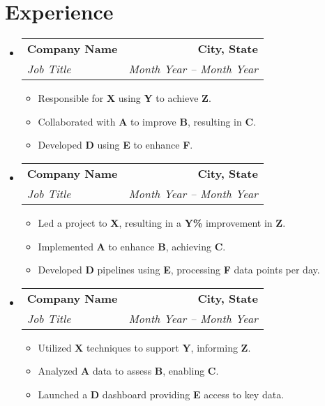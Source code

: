 \documentclass[11pt]{article}
\makeatletter
\newcommand{\resumeSubheadingEducation}[4]{
  \vspace{8pt}\item
    \begin{tabular*}{0.97\textwidth}[t]{@{}l@{\extracolsep{\fill}}r@{}}
      \textbf{#1} & \textbf{#2} \\
      \textit{#3} & \textit{#4} \\
    \end{tabular*}\vspace{-5pt}
}
\newcommand{\singleSubItem}[1]{\item #1\vspace{-4pt}}
\newcommand{\resumeSubHeadingListStart}{\begin{itemize}[leftmargin=*]}
\newcommand{\resumeSubHeadingListEnd}{\end{itemize}}
\newcommand{\resumeItemListStart}{\begin{itemize}}
\newcommand{\resumeItemListEnd}{\end{itemize}\vspace{-5pt}}
\makeatother
\begin{document}
\section{Experience}
  \resumeSubHeadingListStart
  \vspace{-10pt}
\resumeSubheadingEducation{Company Name}{City, State}{Job Title}{Month Year -- Month Year}
      \resumeItemListStart
        \vspace{-1pt}        
        \singleSubItem{Responsible for \textbf{X} using \textbf{Y} to achieve \textbf{Z}.}    
        \singleSubItem{Collaborated with \textbf{A} to improve \textbf{B}, resulting in \textbf{C}.}
        \singleSubItem{Developed \textbf{D} using \textbf{E} to enhance \textbf{F}.}
      \resumeItemListEnd
\vspace{-10pt} 
\resumeSubheadingEducation{Company Name}{City, State}{Job Title}{Month Year -- Month Year}
      \resumeItemListStart
        \vspace{-1pt}
        \singleSubItem{Led a project to \textbf{X}, resulting in a \textbf{Y\%} improvement in \textbf{Z}.}
        \singleSubItem{Implemented \textbf{A} to enhance \textbf{B}, achieving \textbf{C}.}
        \singleSubItem{Developed \textbf{D} pipelines using \textbf{E}, processing \textbf{F} data points per day.}
      \resumeItemListEnd
\vspace{-10pt}
\resumeSubheadingEducation{Company Name}{City, State}{Job Title}{Month Year -- Month Year}
      \resumeItemListStart
        \vspace{-1pt}
        \singleSubItem{Utilized \textbf{X} techniques to support \textbf{Y}, informing \textbf{Z}.}
        \singleSubItem{Analyzed \textbf{A} data to assess \textbf{B}, enabling \textbf{C}.}
        \singleSubItem{Launched a \textbf{D} dashboard providing \textbf{E} access to key data.}
      \resumeItemListEnd
  \resumeSubHeadingListEnd

\end{document}
